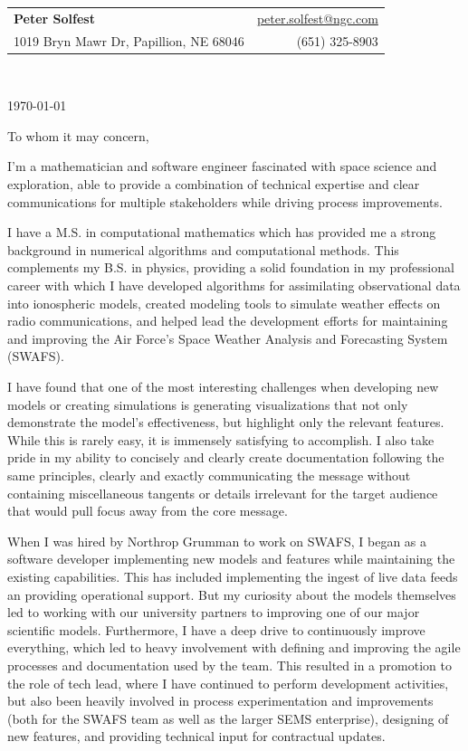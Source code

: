 \documentclass[letterpaper,11pt]{article}
\makeatletter
\newcommand{\email}{\href{mailto:peter.solfest@ngc.com}{peter.solfest@ngc.com}}
\newcommand{\address}{{\footnotesize 1019 Bryn Mawr Dr, Papillion, NE 68046}}
\newcommand{\phone}{(651) 325-8903}
\makeatother
\begin{document}
\newcommand{\mywebheader}{
\begin{tabular*}{7in}{l@{\extracolsep{\fill}}r}
  \textbf{\LARGE Peter Solfest} & \email \\
    \address & \phone  %
\end{tabular*}
\\
\vspace{0.1in}}

\mywebheader

\today

To whom it may concern,

I'm a mathematician and software engineer fascinated with space science and exploration,
able to provide a combination of technical expertise and clear communications for multiple
stakeholders while driving process improvements.

I have a M.S. in computational mathematics which has provided me a strong background in numerical algorithms
and computational methods.
This complements my B.S. in physics, providing a solid foundation in my professional career with which I have
developed algorithms for assimilating observational data into ionospheric models, created
modeling tools to simulate weather effects on radio communications, and helped lead the
development efforts for maintaining and improving the Air Force's Space Weather Analysis and Forecasting System (SWAFS).

I have found that one of the most interesting challenges when developing new models
or creating simulations is generating visualizations that not only demonstrate the model's effectiveness, but 
highlight only the relevant features.
While this is rarely easy, it is immensely satisfying to accomplish.
I also take pride in my ability to concisely and clearly create documentation following the same principles,
clearly and exactly communicating the message without containing miscellaneous tangents or
details irrelevant for the target audience that would pull focus away from the core message.


When I was hired by Northrop Grumman to work on SWAFS, I began as a software
developer implementing new models and features while maintaining the existing capabilities.
This has included implementing the ingest of live data feeds an providing operational support.
But my curiosity about the models themselves led to working with our university partners to improving one of our major scientific models.
Furthermore, I have a deep drive to continuously improve everything, which led to heavy involvement
with defining and improving the agile processes and documentation used by the team.
This resulted in a promotion to the role of tech lead, where I have continued to perform development
activities, but also been heavily involved in process experimentation and improvements (both for the
SWAFS team as well as the larger SEMS enterprise), 
designing of new features, and providing technical input for contractual updates.
\end{document}
